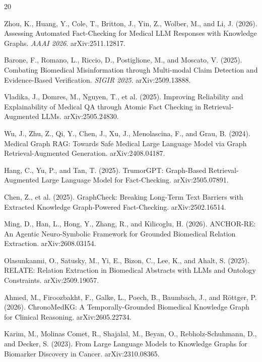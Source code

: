 \documentclass[11pt,a4paper]{article}
\begin{document}
\begin{thebibliography}{20}
\small
\setlength{\itemsep}{2pt}
\setlength{\parskip}{0pt}

Zhou, K., Huang, Y., Cole, T., Britton, J., Yin, Z., Wolber, M., and Li, J. (2026).
Assessing Automated Fact-Checking for Medical LLM Responses with Knowledge Graphs.
\textit{AAAI 2026}. arXiv:2511.12817.

Barone, F., Romano, L., Riccio, D., Postiglione, M., and Moscato, V. (2025).
Combating Biomedical Misinformation through Multi-modal Claim Detection and Evidence-Based Verification.
\textit{SIGIR 2025}. arXiv:2509.13888.

Vladika, J., Domres, M., Nguyen, T., et al. (2025).
Improving Reliability and Explainability of Medical QA through Atomic Fact Checking in Retrieval-Augmented LLMs.
arXiv:2505.24830.

Wu, J., Zhu, Z., Qi, Y., Chen, J., Xu, J., Menolascina, F., and Grau, B. (2024).
Medical Graph RAG: Towards Safe Medical Large Language Model via Graph Retrieval-Augmented Generation.
arXiv:2408.04187.

Hang, C., Yu, P., and Tan, T. (2025).
TrumorGPT: Graph-Based Retrieval-Augmented Large Language Model for Fact-Checking.
arXiv:2505.07891.

Chen, Z., et al. (2025).
GraphCheck: Breaking Long-Term Text Barriers with Extracted Knowledge Graph-Powered Fact-Checking.
arXiv:2502.16514.

Ming, D., Han, L., Hong, Y., Zhang, R., and Kilicoglu, H. (2026).
ANCHOR-RE: An Agentic Neuro-Symbolic Framework for Grounded Biomedical Relation Extraction.
arXiv:2608.03154.

Olasunkanmi, O., Satusky, M., Yi, E., Bizon, C., Lee, K., and Ahalt, S. (2025).
RELATE: Relation Extraction in Biomedical Abstracts with LLMs and Ontology Constraints.
arXiv:2509.19057.

Ahmed, M., Firoozbakht, F., Galke, L., Poech, B., Baumbach, J., and R\"{o}ttger, P. (2026).
ChronoMedKG: A Temporally-Grounded Biomedical Knowledge Graph for Clinical Reasoning.
arXiv:2605.22734.

Karim, M., Molinas Comet, R., Shajalal, M., Beyan, O., Rebholz-Schuhmann, D., and Decker, S. (2023).
From Large Language Models to Knowledge Graphs for Biomarker Discovery in Cancer.
arXiv:2310.08365.


\end{thebibliography}
\end{document}
